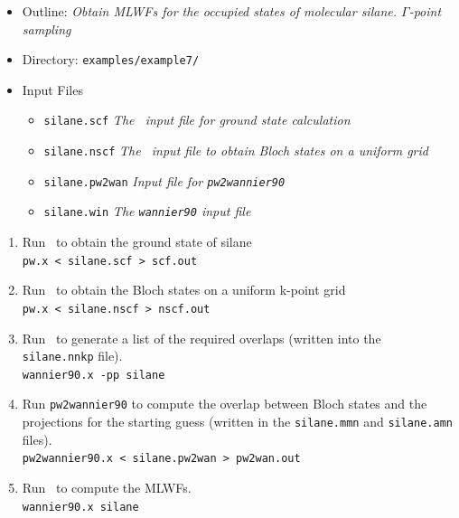 \documentclass[a4paper,11pt,twoside]{article}
\begin{document}


\begin{itemize}
\item{Outline: \it{Obtain MLWFs for the occupied states of molecular
    silane. $\Gamma$-point sampling}} 
\item{Directory: {\tt examples/example7/}}
\item{Input Files}
\begin{itemize}
\item{ {\tt silane.scf}  {\it The \pwscf\ input file for ground state
    calculation}} 
\item{ {\tt silane.nscf}  {\it The \pwscf\ input file to obtain Bloch states
    on a uniform grid}} 
\item{ {\tt silane.pw2wan}  {\it Input file for {\tt pw2wannier90}}}
\item{ {\tt silane.win}  {\it The {\tt wannier90} input file}}
\end{itemize}
\end{itemize}

\begin{enumerate}
\item Run \pwscf\ to obtain the ground state of silane\\
{\tt pw.x < silane.scf > scf.out}

\item Run \pwscf\ to obtain the Bloch states on a uniform k-point grid\\
{\tt pw.x < silane.nscf > nscf.out}

\item Run \wannier\ to generate a list of the required overlaps (written
  into the {\tt silane.nnkp} file).\\ 
{\tt wannier90.x -pp silane}

\item Run {\tt pw2wannier90} to compute the overlap between Bloch
  states and the projections for the starting guess (written in the
  {\tt silane.mmn} and {\tt silane.amn} files).\\  
{\tt pw2wannier90.x < silane.pw2wan > pw2wan.out}

\item Run \wannier\ to compute the MLWFs.\\
{\tt wannier90.x silane}
\end{enumerate}
\end{document}
